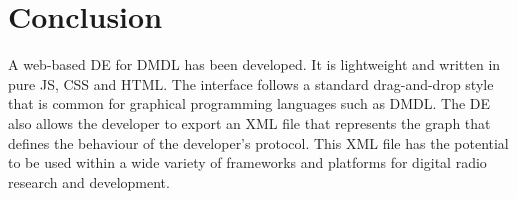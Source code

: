 \documentclass[journal,comsoc]{IEEEtran}
\begin{document}
\section{Conclusion}
A web-based DE for DMDL has been developed. It is lightweight and written in pure JS, CSS and HTML.
The interface follows a standard drag-and-drop style that is common for graphical programming
languages such as DMDL. The DE also allows the developer to export an XML file that represents the
graph that defines the behaviour of the developer's protocol. This XML file has the potential to
be used within a wide variety of frameworks and platforms for digital radio research and
development.
 

%
%



%
%
\end{document}
